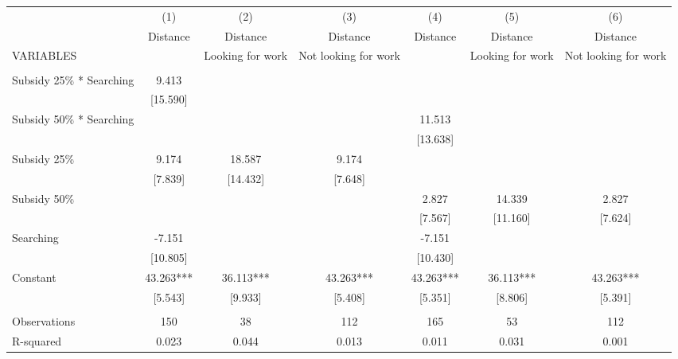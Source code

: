 \begin{tabular}{lcccccc} \hline
 & (1) & (2) & (3) & (4) & (5) & (6) \\
 & Distance & Distance & Distance & Distance & Distance & Distance \\
VARIABLES &  & Looking for work & Not looking for work &  & Looking for work & Not looking for work \\ \hline
 &  &  &  &  &  &  \\
Subsidy 25\% * Searching & 9.413 &  &  &  &  &  \\
 & [15.590] &  &  &  &  &  \\
Subsidy 50\% * Searching &  &  &  & 11.513 &  &  \\
 &  &  &  & [13.638] &  &  \\
Subsidy 25\% & 9.174 & 18.587 & 9.174 &  &  &  \\
 & [7.839] & [14.432] & [7.648] &  &  &  \\
Subsidy 50\% &  &  &  & 2.827 & 14.339 & 2.827 \\
 &  &  &  & [7.567] & [11.160] & [7.624] \\
Searching & -7.151 &  &  & -7.151 &  &  \\
 & [10.805] &  &  & [10.430] &  &  \\
Constant & 43.263*** & 36.113*** & 43.263*** & 43.263*** & 36.113*** & 43.263*** \\
 & [5.543] & [9.933] & [5.408] & [5.351] & [8.806] & [5.391] \\
 &  &  &  &  &  &  \\
Observations & 150 & 38 & 112 & 165 & 53 & 112 \\
 R-squared & 0.023 & 0.044 & 0.013 & 0.011 & 0.031 & 0.001 \\ \hline
\end{tabular}

